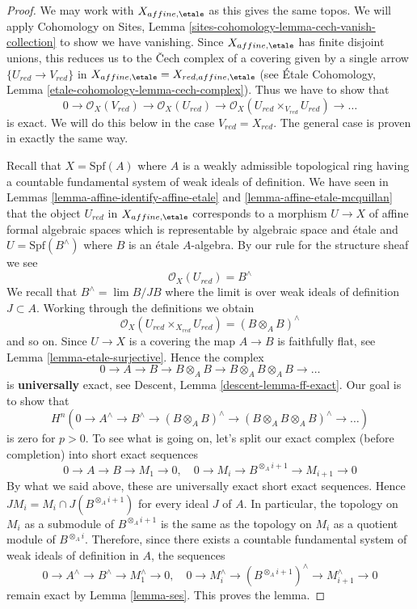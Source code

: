 \begin{proof}
We may work with $X_{affine, \etale}$ as this gives the same topos.
We will apply Cohomology on Sites, Lemma
\ref{sites-cohomology-lemma-cech-vanish-collection}
to show we have vanishing. Since $X_{affine, \etale}$
has finite disjoint unions, this reduces us to the {\v C}ech
complex of a covering given by a single arrow $\{U_{red} \to V_{red}\}$
in $X_{affine, \etale} = X_{red, affine, \etale}$
(see \'Etale Cohomology, Lemma \ref{etale-cohomology-lemma-cech-complex}).
Thus we have to show that
$$
0 \to \mathcal{O}_X(V_{red}) \to \mathcal{O}_X(U_{red}) \to
\mathcal{O}_X(U_{red} \times_{V_{red}} U_{red}) \to \ldots
$$
is exact. We will do this below in the case $V_{red} = X_{red}$.
The general case is proven in exactly the same way.

\medskip\noindent
Recall that $X = \text{Spf}(A)$ where $A$ is a
weakly admissible topological ring having a countable
fundamental system of weak ideals of definition.
We have seen in Lemmas
\ref{lemma-affine-identify-affine-etale} and
\ref{lemma-affine-etale-mcquillan}
that the object $U_{red}$ in $X_{affine, \etale}$
corresponds to a morphism $U \to X$ of affine formal
algebraic spaces which is representable by algebraic space and \'etale
and $U = \text{Spf}(B^\wedge)$ where $B$ is an \'etale $A$-algebra.
By our rule for the structure sheaf we see
$$
\mathcal{O}_X(U_{red}) = B^\wedge
$$
We recall that $B^\wedge = \lim B/JB$ where the limit is over weak
ideals of definition $J \subset A$.
Working through the definitions we obtain
$$
\mathcal{O}_X(U_{red} \times_{X_{red}} U_{red}) = (B \otimes_A B)^\wedge
$$
and so on. Since $U \to X$ is a covering the map $A \to B$
is faithfully flat, see Lemma \ref{lemma-etale-surjective}.
Hence the complex
$$
0 \to A \to B \to B \otimes_A B \to B \otimes_A B \otimes_A B \to \ldots
$$
is {\bf universally} exact, see Descent, Lemma \ref{descent-lemma-ff-exact}.
Our goal is to show that
$$
H^n(0 \to A^\wedge \to B^\wedge \to (B \otimes_A B)^\wedge
\to (B \otimes_A B \otimes_A B)^\wedge \to \ldots)
$$
is zero for $p > 0$. To see what is going on, let's split our
exact complex (before completion) into short exact sequences
$$
0 \to A \to B \to M_1 \to 0,\quad
0 \to M_i \to B^{\otimes_A i + 1} \to M_{i + 1} \to 0
$$
By what we said above, these are universally exact short exact
sequences. Hence $JM_i = M_i \cap J(B^{\otimes_A i + 1})$ for
every ideal $J$ of $A$. In particular, the
topology on $M_i$ as a submodule of $B^{\otimes_A i + 1}$
is the same as the topology on $M_i$ as a quotient module of
$B^{\otimes_A i}$. Therefore, since there exists a countable fundamental system
of weak ideals of definition in $A$, the sequences
$$
0 \to A^\wedge \to B^\wedge \to M_1^\wedge \to 0,\quad
0 \to M_i^\wedge \to (B^{\otimes_A i + 1})^\wedge \to M_{i + 1}^\wedge \to 0
$$
remain exact by Lemma \ref{lemma-ses}. This proves the lemma.
\end{proof}

